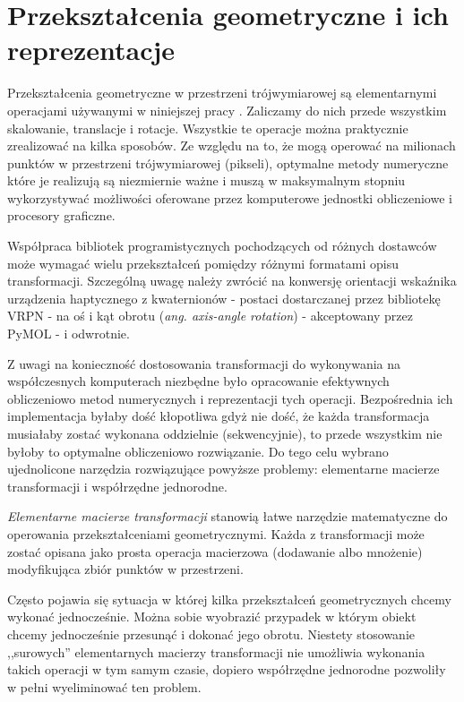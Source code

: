 \documentclass[licencjacka]{pracamgr}
\begin{document}
\section{Przekształcenia geometryczne i ich reprezentacje}
Przekształcenia geometryczne w przestrzeni trójwymiarowej są elementarnymi operacjami używanymi w niniejszej pracy \cite{vanDam2000}. Zaliczamy do nich przede wszystkim skalowanie, translacje i rotacje. Wszystkie te operacje można praktycznie zrealizować na kilka sposobów. Ze względu na to, że mogą operować na milionach punktów w przestrzeni trójwymiarowej (pikseli), optymalne metody numeryczne które je realizują są niezmiernie ważne i muszą w maksymalnym stopniu wykorzystywać możliwości oferowane przez komputerowe jednostki obliczeniowe i procesory graficzne. 

Współpraca bibliotek programistycznych pochodzących od różnych dostawców może wymagać wielu przekształceń pomiędzy różnymi formatami opisu transformacji. Szczególną uwagę należy zwrócić na konwersję orientacji wskaźnika urządzenia haptycznego z kwaternionów - postaci dostarczanej przez bibliotekę VRPN - na oś i kąt obrotu (\textit{ang. axis-angle rotation}) - akceptowany przez PyMOL - i odwrotnie.

Z uwagi na konieczność dostosowania transformacji do wykonywania na współczesnych komputerach niezbędne było opracowanie efektywnych obliczeniowo metod numerycznych i reprezentacji tych operacji. Bezpośrednia ich implementacja byłaby dość kłopotliwa gdyż nie dość, że każda transformacja musiałaby zostać wykonana oddzielnie (sekwencyjnie), to przede wszystkim nie byłoby to optymalne obliczeniowo rozwiązanie. Do tego celu wybrano ujednolicone narzędzia rozwiązujące powyższe problemy: elementarne macierze transformacji i współrzędne jednorodne.

\textit{Elementarne macierze transformacji} stanowią łatwe narzędzie matematyczne do operowania przekształceniami geometrycznymi. Każda z transformacji może zostać opisana jako prosta operacja macierzowa (dodawanie albo mnożenie) modyfikująca zbiór punktów w przestrzeni.

Często pojawia się sytuacja w której kilka przekształceń geometrycznych chcemy wykonać jednocześnie. Można sobie wyobrazić przypadek w którym obiekt chcemy jednocześnie przesunąć i dokonać jego obrotu. Niestety stosowanie ,,surowych'' elementarnych macierzy transformacji nie umożliwia wykonania takich operacji w tym samym czasie, dopiero współrzędne jednorodne pozwoliły w pełni wyeliminować ten problem.
\end{document}
